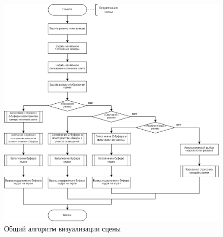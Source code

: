 \begin{figure}[h] 
	\centering
	\includegraphics[width=1\textwidth]{images/scene-visualization.png}
	\caption{Общий алгоритм визуализации сцены} 
	\label{fig:scene-visualization} 
\end{figure}

\clearpage

